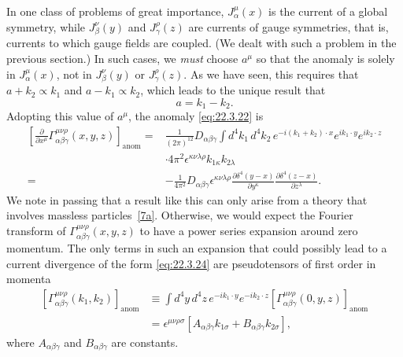 In one class of problems of great importance, $J_\alpha^\mu(x)$ is the
current of a global symmetry, while $J_\beta^\nu(y)$ and
$J_\gamma^\rho(z)$ are currents of gauge symmetries, that is, currents to
which gauge fields are coupled. (We dealt with such a problem in the
previous section.) In such cases, we \emph{must} choose $a^\mu$ so that the
anomaly is solely in $J_\alpha^\mu(x)$, not in $J_\beta^\nu(y)$ or
$J_\gamma^\rho(z)$. As we have seen, this requires that
$a+k_2\propto k_1$ and $a-k_1\propto k_2$, which leads to the unique result
that
\begin{equation}
 a=k_1-k_2.
 \tag{22.3.23}\label{eq:22.3.23}
\end{equation}
Adopting this value of $a^\mu$, the anomaly \eqref{eq:22.3.22} is
\begin{equation}
 \begin{aligned}
 \left[
  \frac{\partial}{\partial x^\mu}
  \Gamma_{\alpha\beta\gamma}^{\mu\nu\rho}(x,y,z)
 \right]_{\mathrm{anom}}
 ={}&\frac{1}{(2\pi)^{12}}D_{\alpha\beta\gamma}
 \int d^4k_1\,d^4k_2\,
 e^{-i(k_1+k_2)\cdot x}e^{ik_1\cdot y}e^{ik_2\cdot z}
 \\
 &\cdot4\pi^2\epsilon^{\kappa\nu\lambda\rho}
 k_{1\kappa}k_{2\lambda}
 \\
 ={}&-\frac{1}{4\pi^2}D_{\alpha\beta\gamma}
 \epsilon^{\kappa\nu\lambda\rho}
 \frac{\partial\delta^4(y-x)}{\partial y^\kappa}
 \frac{\partial\delta^4(z-x)}{\partial z^\lambda}.
 \end{aligned}
 \tag{22.3.24}\label{eq:22.3.24}
\end{equation}
We note in passing that a result like this can only arise from a theory
that involves massless particles~\hyperref[ch22-ref-7a]{[7a]}. Otherwise,
we would expect the Fourier transform of
$\Gamma_{\alpha\beta\gamma}^{\mu\nu\rho}(x,y,z)$ to have a power series
expansion around zero momentum. The only terms in such an expansion that
could possibly lead to a current divergence of the form
\eqref{eq:22.3.24} are pseudotensors of first order in momenta
\[
 \begin{aligned}
 \left[
  \Gamma_{\alpha\beta\gamma}^{\mu\nu\rho}(k_1,k_2)
 \right]_{\mathrm{anom}}
 &\equiv\int d^4y\,d^4z\,
 e^{-ik_1\cdot y}e^{-ik_2\cdot z}
 \left[
  \Gamma_{\alpha\beta\gamma}^{\mu\nu\rho}(0,y,z)
 \right]_{\mathrm{anom}}
 \\
 &=\epsilon^{\mu\nu\rho\sigma}
 \left[
  A_{\alpha\beta\gamma}k_{1\sigma}
  +B_{\alpha\beta\gamma}k_{2\sigma}
 \right],
 \end{aligned}
\]
where $A_{\alpha\beta\gamma}$ and $B_{\alpha\beta\gamma}$ are constants.
